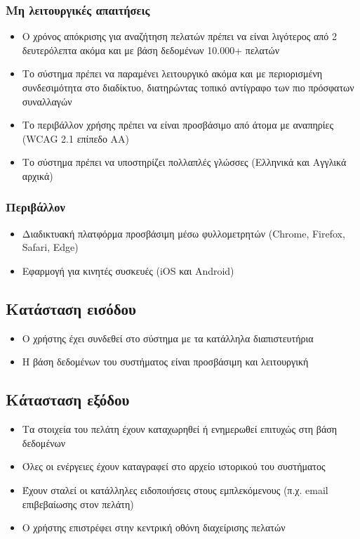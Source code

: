 \documentclass[12pt,a4paper,twoside]{book}
\begin{document}
\subsubsection{Μη λειτουργικές απαιτήσεις}
\begin{itemize}
  \item Ο χρόνος απόκρισης για αναζήτηση πελατών πρέπει να είναι λιγότερος από 2 δευτερόλεπτα ακόμα και με βάση δεδομένων 10.000+ πελατών %
  \item Το σύστημα πρέπει να παραμένει λειτουργικό ακόμα και με περιορισμένη συνδεσιμότητα στο διαδίκτυο, διατηρώντας τοπικό αντίγραφο των πιο πρόσφατων συναλλαγών %
  \item Το περιβάλλον χρήσης πρέπει να είναι προσβάσιμο από άτομα με αναπηρίες (WCAG 2.1 επίπεδο AA) %
  \item Το σύστημα πρέπει να υποστηρίζει πολλαπλές γλώσσες (Ελληνικά και Αγγλικά αρχικά)
\end{itemize}

\subsubsection{Περιβάλλον}
\begin{itemize}
  \item Διαδικτυακή πλατφόρμα προσβάσιμη μέσω φυλλομετρητών (Chrome, Firefox, Safari, Edge) %
  \item Εφαρμογή για κινητές συσκευές (iOS και Android)
\end{itemize}

\subsection{Κατάσταση εισόδου} %
\begin{itemize}
  \item Ο χρήστης έχει συνδεθεί στο σύστημα με τα κατάλληλα διαπιστευτήρια %
  \item Η βάση δεδομένων του συστήματος είναι προσβάσιμη και λειτουργική %
\end{itemize}

\subsection{Κάτασταση εξόδου} %
\begin{itemize}
  \item Τα στοιχεία του πελάτη έχουν καταχωρηθεί ή ενημερωθεί επιτυχώς στη βάση δεδομένων %
  \item Όλες οι ενέργειες έχουν καταγραφεί στο αρχείο ιστορικού του συστήματος
  \item Έχουν σταλεί οι κατάλληλες ειδοποιήσεις στους εμπλεκόμενους (π.χ. email επιβεβαίωσης στον πελάτη)  %
  \item Ο χρήστης επιστρέφει στην κεντρική οθόνη διαχείρισης πελατών %
\end{itemize}
\end{document}
